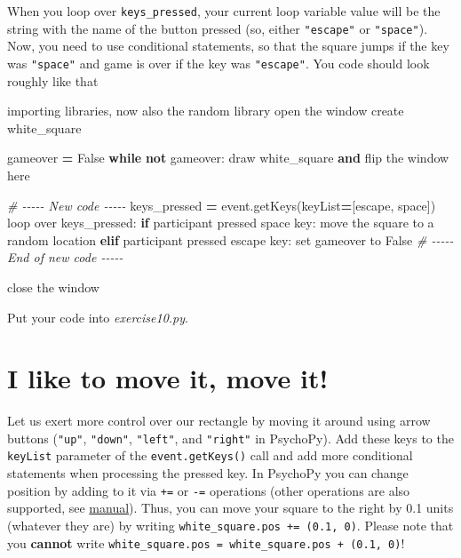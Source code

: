 \documentclass[
]{book}
\newenvironment{Shaded}{\begin{snugshade}}{\end{snugshade}}
\newcommand{\BuiltInTok}[1]{#1}
\newcommand{\CommentTok}[1]{\textcolor[rgb]{0.56,0.35,0.01}{\textit{#1}}}
\newcommand{\ControlFlowTok}[1]{\textcolor[rgb]{0.13,0.29,0.53}{\textbf{#1}}}
\newcommand{\KeywordTok}[1]{\textcolor[rgb]{0.13,0.29,0.53}{\textbf{#1}}}
\newcommand{\NormalTok}[1]{#1}
\newcommand{\OperatorTok}[1]{\textcolor[rgb]{0.81,0.36,0.00}{\textbf{#1}}}
\newcommand{\StringTok}[1]{\textcolor[rgb]{0.31,0.60,0.02}{#1}}
\newcommand{\VariableTok}[1]{\textcolor[rgb]{0.00,0.00,0.00}{#1}}
\begin{document}
When you loop over \texttt{keys\_pressed}, your current loop variable value will be the string with the name of the button pressed (so, either \texttt{"escape"} or \texttt{"space"}). Now, you need to use conditional statements, so that the square jumps if the key was \texttt{"space"} and game is over if the key was \texttt{"escape"}. You code should look roughly like that

\begin{Shaded}
\begin{Highlighting}[]
\NormalTok{importing libraries, now also the random library}
\BuiltInTok{open}\NormalTok{ the window}
\NormalTok{create white\_square}

\NormalTok{gameover }\OperatorTok{=} \VariableTok{False}
\ControlFlowTok{while} \KeywordTok{not}\NormalTok{ gameover:}
\NormalTok{    draw white\_square }\KeywordTok{and}\NormalTok{ flip the window here}
    
    \CommentTok{\# {-}{-}{-}{-}{-} New code {-}{-}{-}{-}{-}}
\NormalTok{    keys\_pressed }\OperatorTok{=}\NormalTok{ event.getKeys(keyList}\OperatorTok{=}\NormalTok{[}\StringTok{\textquotesingle{}escape\textquotesingle{}}\NormalTok{, }\StringTok{\textquotesingle{}space\textquotesingle{}}\NormalTok{])}
\NormalTok{    loop over keys\_pressed:}
        \ControlFlowTok{if}\NormalTok{ participant pressed space key:}
\NormalTok{            move the square to a random location}
        \ControlFlowTok{elif}\NormalTok{ participant pressed escape key:}
            \BuiltInTok{set}\NormalTok{ gameover to }\VariableTok{False}
    \CommentTok{\# {-}{-}{-}{-}{-} End of new code {-}{-}{-}{-}{-}}

\NormalTok{close the window}
\end{Highlighting}
\end{Shaded}

Put your code into \emph{exercise10.py}.

\hypertarget{i-like-to-move-it-move-it}{%
\section{I like to move it, move it!}\label{i-like-to-move-it-move-it}}

Let us exert more control over our rectangle by moving it around using arrow buttons (\texttt{"up"}, \texttt{"down"}, \texttt{"left"}, and \texttt{"right"} in PsychoPy). Add these keys to the \texttt{keyList} parameter of the \texttt{event.getKeys()} call and add more conditional statements when processing the pressed key. In PsychoPy you can change position by adding to it via \texttt{+=} or \texttt{-=} operations (other operations are also supported, see \href{https://psychopy.org/coder/codeStimuli.html\#attrib-operations}{manual}). Thus, you can move your square to the right by 0.1 units (whatever they are) by writing \texttt{white\_square.pos\ +=\ (0.1,\ 0)}. Please note that you \textbf{cannot} write \texttt{white\_square.pos\ =\ white\_square.pos\ +\ (0.1,\ 0)}!
\end{document}

